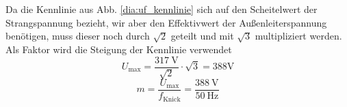 \chapter{}\label{ex:aufg6}
%
\section{}\label{sec:aufg6a}
%
Da die Kennlinie aus Abb. \ref{dia:uf_kennlinie} sich auf den Scheitelwert der Strangspannung bezieht, wir aber den Effektivwert der Außenleiterspannung benötigen, muss dieser noch durch $\sqrt 2$ geteilt und mit $\sqrt 3$ multipliziert werden.
Als Faktor wird die Steigung der Kennlinie verwendet
\begin{equation}
	U_{\text{max}} = \frac{317~\text{V}}{\sqrt{2}} \cdot \sqrt{3} = 388 \text{V}
\end{equation}
\begin{equation}
	m = \frac{U_{\text{max}}}{f_{\text{Knick}}} = \frac{388~\text{V}}{50~\text{Hz}}
\end{equation}
%
\section{}\label{sec:aufg6b}
%

%
\section{}\label{sec:aufg6c}
%
